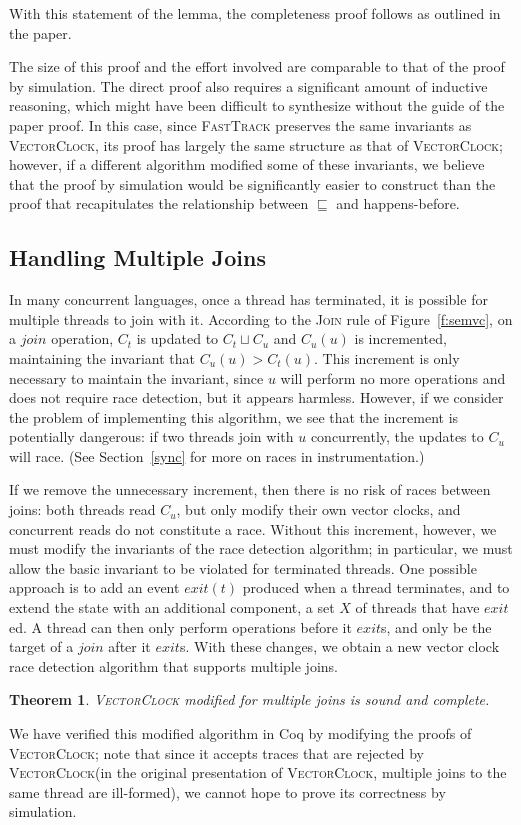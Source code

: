 \documentclass[preprint, 9pt]{sigplanconf}
\newcommand{\VCalg}{\textsc{VectorClock}\xspace}
\newcommand{\FT}{\textsc{FastTrack}\xspace}
\newcommand{\Rule}[1]{\textsc{#1}}
\newtheorem{theorem}{Theorem}
\begin{document}
\noindent With this statement of the lemma, the completeness proof follows as outlined in the paper.

The size of this proof and the effort involved are comparable to that of the proof by simulation. The direct proof also requires a significant amount of inductive reasoning, which might have been difficult to synthesize without the guide of the paper proof. In this case, since \FT preserves the same invariants as \VCalg, its proof has largely the same structure as that of \VCalg; however, if a different algorithm modified some of these invariants, we believe that the proof by simulation would be significantly easier to construct than the proof that recapitulates the relationship between $\sqsubseteq$ and happens-before.

\subsection{Handling Multiple Joins}
\label{waits}
In many concurrent languages, once a thread has terminated, it is possible for multiple threads to join with it. According to the \Rule{Join} rule of Figure~\ref{f:semvc}, on a $\mathit{join}$ operation, $C_t$ is updated to $C_t \sqcup C_u$ and $C_u(u)$ is incremented, maintaining the invariant that $C_u(u) > C_t(u)$. This increment is only necessary to maintain the invariant, since $u$ will perform no more operations and does not require race detection, but it appears harmless. However, if we consider the problem of implementing this algorithm, we see that the increment is potentially dangerous: if two threads join with $u$ concurrently, the updates to $C_u$ will race. (See Section~\ref{sync} for more on races in instrumentation.)

If we remove the unnecessary increment, then there is no risk of races between joins: both threads read $C_u$, but only modify their own vector clocks, and concurrent reads do not constitute a race. Without this increment, however, we must modify the invariants of the race detection algorithm; in particular, we must allow the basic invariant to be violated for terminated threads. One possible approach is to add an event $\mathit{exit}(t)$ produced when a thread terminates, and to extend the state with an additional component, a set $X$ of threads that have $\mathit{exit}$ed. A thread can then only perform operations before it $\mathit{exit}$s, and only be the target of a $\mathit{join}$ after it $\mathit{exit}$s. With these changes, we obtain a new vector clock race detection algorithm that supports multiple joins.
\begin{theorem}\VCalg modified for multiple joins is sound and complete.\end{theorem}
We have verified this modified algorithm in Coq by modifying the proofs of \VCalg; note that since it accepts traces that are rejected by \VCalg (in the original presentation of \VCalg, multiple joins to the same thread are ill-formed), we cannot hope to prove its correctness by simulation.
\end{document}
